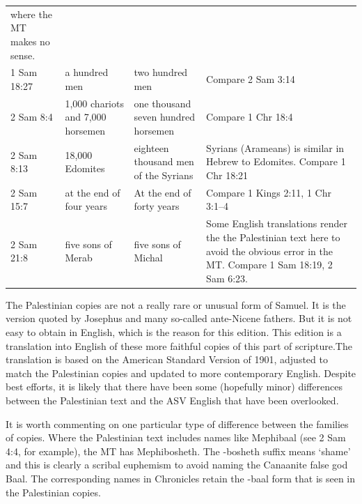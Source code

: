 {\begin{tabular}{p{}p{}p{}p{}}
                                                           where the
                                                           MT makes no
                                                           sense.\\
  1 Sam 18:27&a hundred men&two hundred men&Compare 2 Sam 3:14\\
  2 Sam 8:4&1,000 chariots and 7,000 horsemen&one thousand seven
                                               hundred
                                               horsemen&Compare 1 Chr
                                                         18:4\\
  2 Sam 8:13&18,000 Edomites&eighteen thousand men of the
                              Syrians&Syrians (Arameans) is similar in
                                       Hebrew to Edomites. Compare 1
                                       Chr 18:21\\
  2 Sam 15:7&at the end of four years&At the end of forty
                                       years&Compare 1 Kings 2:11, 1
                                              Chr 3:1--4\\
  2 Sam 21:8&five sons of Merab&five sons of Michal&Some English
                                                     translations
                                                     render the
                                                     the Palestinian text here
                                                     to avoid the
                                                     obvious error in
                                                     the MT. Compare 1
                                                     Sam 18:19, 2 Sam
                                                     6:23.
\end{tabular}
The Palestinian copies are not a really rare or unusual form of
Samuel. It is the version quoted by Josephus and many so-called
ante-Nicene fathers. But it is not easy to obtain in English, which is the reason
for this edition. This edition is a translation into
English of these more faithful copies of this part of scripture.The
translation is based on the American Standard
Version of 1901, adjusted to match the Palestinian
copies and updated to more contemporary English. Despite best efforts, it is likely that there have been
some (hopefully minor)
differences between the Palestinian text and the ASV English that have been
overlooked.

It is worth commenting on one particular type of difference between
the families of copies. Where the Palestinian text includes names like
Mephibaal (see 2 Sam 4:4, for example), the MT has Mephibosheth. The
-bosheth suffix means `shame' and this is clearly a scribal euphemism
to avoid naming the Canaanite false god Baal. The corresponding names
in Chronicles retain the -baal form that is seen in the Palestinian
copies.

}
